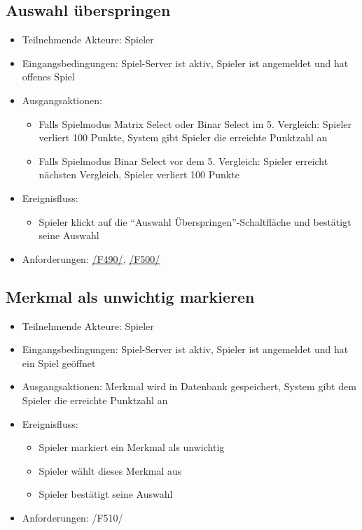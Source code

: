 \documentclass[a4paper]{scrreprt}
\begin{document}
	\subsection{Auswahl überspringen}
	\begin{itemize}
		\item Teilnehmende Akteure: \Gls{Spieler}
		\item Eingangsbedingungen: \Gls{Spiel-Server} ist aktiv, \Gls{Spieler} ist angemeldet und hat offenes Spiel
        \item Ausgangsaktionen: \begin{itemize}
					\item Falls Spielmodus \Gls{Matrix Select} oder \Gls{Binar Select} im 5. Vergleich: Spieler verliert 100 Punkte, System gibt \Gls{Spieler} die erreichte Punktzahl an
					\item Falls Spielmodus \Gls{Binar Select} vor dem 5. Vergleich: Spieler erreicht nächsten Vergleich, Spieler verliert 100 Punkte
                    \end{itemize}
		\item Ereignisfluss:
		\begin{itemize}
			\item \Gls{Spieler} klickt auf die \enquote{Auswahl Überspringen}-Schaltfläche und bestätigt seine Auswahl
		\end{itemize}
        \item Anforderungen: \hyperlink{F490}{/F490/}, \hyperlink{F500}{/F500/}
	\end{itemize}

	\subsection{Merkmal als unwichtig markieren}
	\begin{itemize}
		\item Teilnehmende Akteure: \Gls{Spieler}
		\item Eingangsbedingungen: \Gls{Spiel-Server} ist aktiv, \Gls{Spieler} ist angemeldet und hat ein Spiel geöffnet
		\item Ausgangsaktionen: \Gls{Merkmal} wird in Datenbank gespeichert, System gibt dem \Gls{Spieler} die erreichte Punktzahl an
		\item Ereignisfluss:
		\begin{itemize}
			\item \Gls{Spieler} markiert ein \Gls{Merkmal} als unwichtig
			\item \Gls{Spieler} wählt dieses \Gls{Merkmal} aus
			\item \Gls{Spieler} bestätigt seine Auswahl
		\end{itemize}
		\item Anforderungen: /F510/
	\end{itemize}
     
\end{document}
